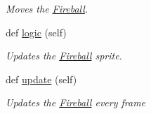 \begin{DoxyCompactItemize}
\begin{DoxyCompactList}\small\item\em Moves the \hyperlink{classactor_1_1fireball_1_1_fireball}{Fireball}. \end{DoxyCompactList}\item 
def \hyperlink{classactor_1_1fireball_1_1_fireball_ad19f7a375bf095055aadce16138d5713}{logic} (self)
\begin{DoxyCompactList}\small\item\em Updates the \hyperlink{classactor_1_1fireball_1_1_fireball}{Fireball} sprite. \end{DoxyCompactList}\item 
def \hyperlink{classactor_1_1fireball_1_1_fireball_af65dbfd4e9993637a797cc9cf7475238}{update} (self)
\begin{DoxyCompactList}\small\item\em Updates the \hyperlink{classactor_1_1fireball_1_1_fireball}{Fireball} every frame \end{DoxyCompactList}\end{DoxyCompactItemize}
